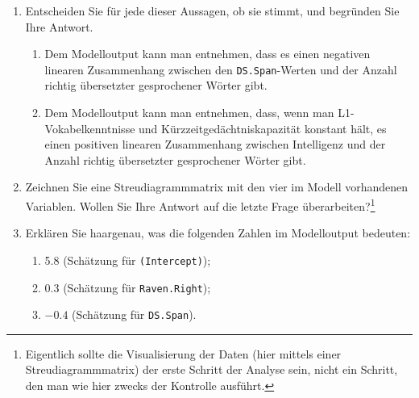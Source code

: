 \documentclass[oneside, 10pt]{book}\usepackage[]{graphicx}\usepackage[]{xcolor}
\makeatletter
\newenvironment{kframe}{%
 \def\at@end@of@kframe{}%
 \ifinner\ifhmode%
  \def\at@end@of@kframe{\end{minipage}}%
  \begin{minipage}{\columnwidth}%
 \fi\fi%
 \def\FrameCommand##1{\hskip\@totalleftmargin \hskip-\fboxsep
 \colorbox{shadecolor}{##1}\hskip-\fboxsep
     \hskip-\linewidth \hskip-\@totalleftmargin \hskip\columnwidth}%
 \MakeFramed {\advance\hsize-\width
   \@totalleftmargin\z@ \linewidth\hsize
   \@setminipage}}%
 {\par\unskip\endMakeFramed%
 \at@end@of@kframe}
\newenvironment{knitrout}{}{} %
\makeatother
\begin{document}
\begin{enumerate}
\begin{knitrout}
\begin{kframe}
\begin{verbatim}
\end{verbatim}
\end{kframe}
\end{knitrout}
  \begin{enumerate}
    \item Entscheiden Sie für jede dieser Aussagen, ob sie stimmt, und begründen
   Sie Ihre Antwort.
   \begin{enumerate}
    \item Dem Modelloutput kann man entnehmen, dass es einen negativen
    linearen Zusammenhang zwischen den \texttt{DS.Span}-Werten
    und der Anzahl richtig übersetzter gesprochener Wörter gibt.

    \item Dem Modelloutput kann man entnehmen, dass, wenn man
    L1-Vokabel\-kennt\-nisse und Kürz\-zeit\-gedächtnis\-kapa\-zität konstant hält,
    es einen positiven linearen Zusammenhang zwischen Intelligenz
    und der Anzahl richtig übersetzter gesprochener Wörter gibt.
   \end{enumerate}

   \item  Zeichnen Sie eine Streudiagrammmatrix mit den vier im Modell vorhandenen Variablen.
   Wollen Sie Ihre Antwort auf die letzte Frage überarbeiten?\footnote{Eigentlich sollte die Visualisierung der Daten (hier mittels einer
Streudiagrammmatrix) der erste Schritt der Analyse sein,
nicht ein Schritt, den man wie hier zwecks der Kontrolle ausführt.}

   \item Erklären Sie haargenau, was die folgenden Zahlen im Modell\-output bedeuten:
   \begin{enumerate}
    \item 5.8 (Schätzung für \texttt{(Intercept)});
    \item 0.3 (Schätzung für \texttt{Raven.Right});
    \item $-0.4$ (Schätzung für \texttt{DS.Span}).
   \end{enumerate}

  \end{enumerate}


\end{enumerate}
\end{document}

